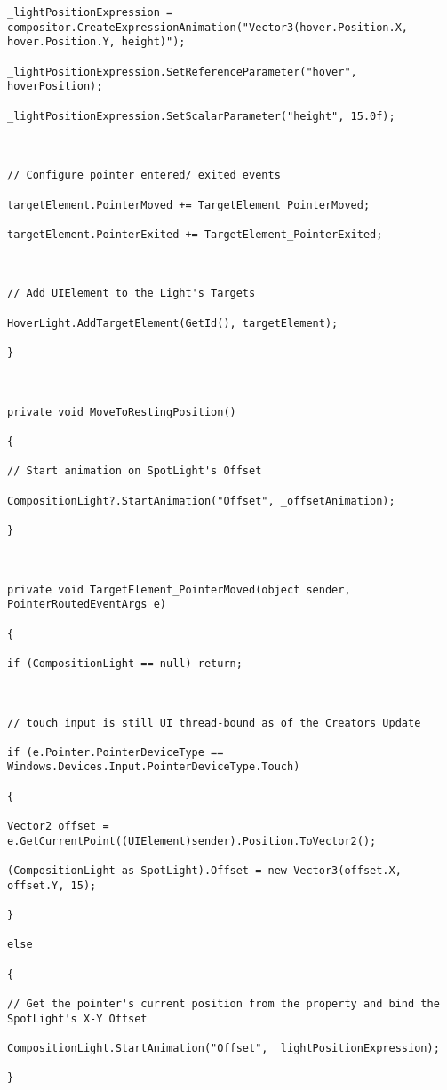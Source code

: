 \begin{lstlisting}[style=CSharpStyle]
_lightPositionExpression = compositor.CreateExpressionAnimation("Vector3(hover.Position.X, hover.Position.Y, height)");

_lightPositionExpression.SetReferenceParameter("hover", hoverPosition);

_lightPositionExpression.SetScalarParameter("height", 15.0f);



// Configure pointer entered/ exited events

targetElement.PointerMoved += TargetElement_PointerMoved;

targetElement.PointerExited += TargetElement_PointerExited;



// Add UIElement to the Light's Targets

HoverLight.AddTargetElement(GetId(), targetElement);

}



private void MoveToRestingPosition()

{

// Start animation on SpotLight's Offset 

CompositionLight?.StartAnimation("Offset", _offsetAnimation);

}



private void TargetElement_PointerMoved(object sender, PointerRoutedEventArgs e)

{

if (CompositionLight == null) return;



// touch input is still UI thread-bound as of the Creators Update

if (e.Pointer.PointerDeviceType == Windows.Devices.Input.PointerDeviceType.Touch)

{

Vector2 offset = e.GetCurrentPoint((UIElement)sender).Position.ToVector2();

(CompositionLight as SpotLight).Offset = new Vector3(offset.X, offset.Y, 15);

}

else

{

// Get the pointer's current position from the property and bind the SpotLight's X-Y Offset

CompositionLight.StartAnimation("Offset", _lightPositionExpression);

}


\end{lstlisting}
